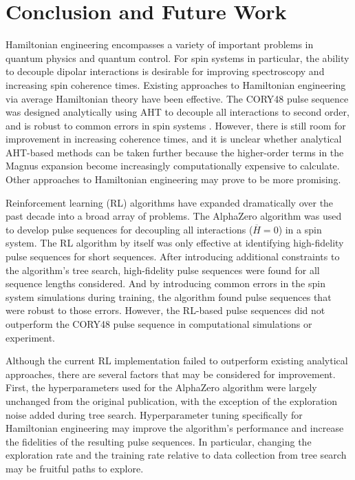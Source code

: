 \chapter{Conclusion and Future Work}

Hamiltonian engineering encompasses a variety of important problems in quantum physics and quantum control. For spin systems in particular, the ability to decouple dipolar interactions is desirable for improving spectroscopy and increasing spin coherence times.
Existing approaches to Hamiltonian engineering via average Hamiltonian theory have been effective. The CORY48 pulse sequence was designed analytically using AHT to decouple all interactions to second order, and is robust to common errors in spin systems \cite{CORY1990205}. However, there is still room for improvement in increasing coherence times, and it is unclear whether analytical AHT-based methods can be taken further because the higher-order terms in the Magnus expansion become increasingly computationally expensive to calculate. Other approaches to Hamiltonian engineering may prove to be more promising.

Reinforcement learning (RL) algorithms have expanded dramatically over the past decade into a broad array of problems. The AlphaZero algorithm was used to develop pulse sequences for decoupling all interactions ($\overline{H} = 0$) in a spin system. The RL algorithm by itself was only effective at identifying high-fidelity pulse sequences for short sequences. After introducing additional constraints to the algorithm's tree search, high-fidelity pulse sequences were found for all sequence lengths considered. And by introducing common errors in the spin system simulations during training, the algorithm found pulse sequences that were robust to those errors. However, the RL-based pulse sequences did not outperform the CORY48 pulse sequence in computational simulations or experiment.


Although the current RL implementation failed to outperform existing analytical approaches, there are several factors that may be considered for improvement.
First, the hyperparameters used for the AlphaZero algorithm were largely unchanged from the original publication, with the exception of the exploration noise added during tree search. Hyperparameter tuning specifically for Hamiltonian engineering may improve the algorithm's performance and increase the fidelities of the resulting pulse sequences. In particular, changing the exploration rate and the training rate relative to data collection from tree search may be fruitful paths to explore.

